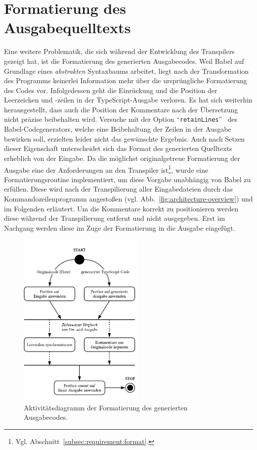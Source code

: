 {\section{Formatierung des Ausgabequelltexts}
\label{sec:formatting}

Eine weitere Problematik, die sich während der Entwicklung des Transpilers gezeigt hat, ist die Formatierung des generierten Ausgabecodes. Weil Babel auf Grundlage eines \emph{abstrakten} Syntaxbaums arbeitet, liegt nach der Transformation des Programms keinerlei Information mehr über die ursprüngliche Formatierung des Codes vor. Infolgedessen geht die Einrückung und die Position der Leerzeichen und -zeilen in der TypeScript-Ausgabe verloren. Es hat sich weiterhin herausgestellt, dass auch die Position der Kommentare nach der Übersetzung nicht präzise beibehalten wird. Versuche mit der Option \enquote{\texttt{retainLines}}~\autocite{BABEL:GENERATOR} des Babel-Codegenerators, welche eine Beibehaltung der Zeilen in der Ausgabe bewirken soll, erzielten leider nicht das gewünschte Ergebnis. Auch nach Setzen dieser Eigenschaft unterscheidet sich das Format des generierten Quelltexts erheblich von der Eingabe. Da die möglichst originalgetreue Formatierung der Ausgabe eine der Anforderungen an den Transpiler ist\footnote{Vgl. Abschnitt~\ref{subsec:requirement:format}.}, wurde eine Formatierungsroutine implementiert, um diese Vorgabe unabhängig von Babel zu erfüllen. Diese wird nach der Transpilierung aller Eingabedateien durch das Kommandozeilenprogramm angestoßen (vgl. Abb.~\ref{fig:architecture-overview}) und im Folgenden erläutert. Um die Kommentare korrekt zu positionieren werden diese während der Transpilierung entfernt und nicht ausgegeben. Erst im Nachgang werden diese im Zuge der Formatierung in die Ausgabe eingefügt.

\begin{figure}[htb]
  \centering
  \includegraphics[width=0.55\textwidth]{src/4_Umsetzung/fig/activity-diagram-formatting.pdf}
	\caption[Aktivitätsdiagramm der Formatierung des Ausgabecodes]{Aktivitätsdiagramm der Formatierung des generierten Ausgabecodes.}
	\label{fig:activity-diagram-formatting}
\end{figure}

}
